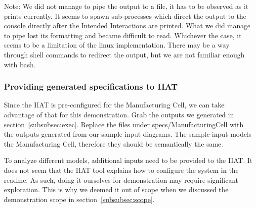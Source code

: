     Note: We did not manage to pipe the output to a file, it has to be observed as it prints currently.
    It seems to spawn sub-processes which direct the output to the console directly after the Intended Interactions are printed.
    What we did manage to pipe lost its formatting and became difficult to read.
    Whichever the case, it seems to be a limitation of the linux implementation.
    There may be a way through shell commands to redirect the output, but we are not familiar enough with bash.

    \subsubsection{Providing generated specifications to IIAT}
    Since the IIAT is pre-configured for the Manufacturing Cell,
    we can take advantage of that for this demonstration.
    Grab the outputs we generated in section~\ref{subsubsec:exec}.
    Replace the files under specs/ManufacturingCell with the outputs generated from our sample input diagrams.
    The sample input models the Manufacturing Cell, therefore they should be semantically the same.

    To analyze different models, additional inputs need to be provided to the IIAT\@.
    It does not seem that the IIAT tool explains how to configure the system in the readme.
    As such, doing it ourselves for demonstration may require significant exploration.
    This is why we deemed it out of scope when we discussed the demonstration scope in section~\ref{subsubsec:scope}.